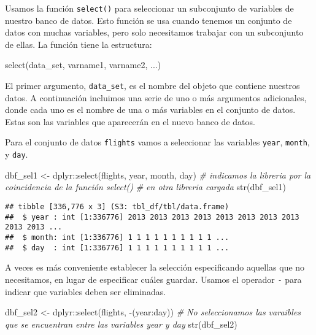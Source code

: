 \documentclass[
]{book}
\newenvironment{Shaded}{\begin{snugshade}}{\end{snugshade}}
\newcommand{\CommentTok}[1]{\textcolor[rgb]{0.56,0.35,0.01}{\textit{#1}}}
\newcommand{\FunctionTok}[1]{\textcolor[rgb]{0.00,0.00,0.00}{#1}}
\newcommand{\NormalTok}[1]{#1}
\newcommand{\OtherTok}[1]{\textcolor[rgb]{0.56,0.35,0.01}{#1}}
\newcommand{\SpecialCharTok}[1]{\textcolor[rgb]{0.00,0.00,0.00}{#1}}
\begin{document}
Usamos la función \texttt{select()} para seleccionar un subconjunto de variables de nuestro banco de datos. Esto función se usa cuando tenemos un conjunto de datos con muchas variables, pero solo necesitamos trabajar con un subconjunto de ellas. La función tiene la estructura:

\begin{Shaded}
\begin{Highlighting}[]
\FunctionTok{select}\NormalTok{(data\_set, varname1, varname2, ...)}
\end{Highlighting}
\end{Shaded}

El primer argumento, \texttt{data\_set}, es el nombre del objeto que contiene nuestros datos. A continuación incluimos una serie de uno o más argumentos adicionales, donde cada uno es el nombre de una o más variables en el conjunto de datos. Estas son las variables que aparecerán en el nuevo banco de datos.

Para el conjunto de datos \texttt{flights} vamos a seleccionar las variables \texttt{year}, \texttt{month}, y \texttt{day}.

\begin{Shaded}
\begin{Highlighting}[]
\NormalTok{dbf\_sel1 }\OtherTok{\textless{}{-}}\NormalTok{ dplyr}\SpecialCharTok{::}\FunctionTok{select}\NormalTok{(flights, year, month, day)}
\CommentTok{\# indicamos la libreria por la coincidencia de la función select()}
\CommentTok{\# en otra libreria cargada}
\FunctionTok{str}\NormalTok{(dbf\_sel1) }
\end{Highlighting}
\end{Shaded}

\begin{verbatim}
## tibble [336,776 x 3] (S3: tbl_df/tbl/data.frame)
##  $ year : int [1:336776] 2013 2013 2013 2013 2013 2013 2013 2013 2013 2013 ...
##  $ month: int [1:336776] 1 1 1 1 1 1 1 1 1 1 ...
##  $ day  : int [1:336776] 1 1 1 1 1 1 1 1 1 1 ...
\end{verbatim}

A veces es más conveniente establecer la selección especificando aquellas que no necesitamos, en lugar de especificar cuáles guardar. Usamos el operador \texttt{-} para indicar que variables deben ser eliminadas.

\begin{Shaded}
\begin{Highlighting}[]
\NormalTok{dbf\_sel2 }\OtherTok{\textless{}{-}}\NormalTok{ dplyr}\SpecialCharTok{::}\FunctionTok{select}\NormalTok{(flights, }\SpecialCharTok{{-}}\NormalTok{(year}\SpecialCharTok{:}\NormalTok{day)) }
\CommentTok{\# No seleccionamos las varaibles que se encuentran entre las variables year y day}
\FunctionTok{str}\NormalTok{(dbf\_sel2)}
\end{Highlighting}
\end{Shaded}
\end{document}
